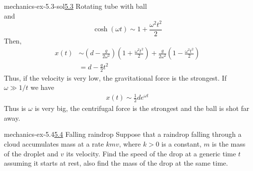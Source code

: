 \documentclass[preview]{standalone}
\begin{document}
\begin{snippetsolution}{mechanics-ex-5.3-sol}{\underline{5.3} Rotating tube with ball}
\[    \] and 
    \[
        \cosh(\omega t) \sim 1 + \frac{\omega^2 t^2}{2}
    \]
    Then,
    \begin{align*}
        x(t) &\sim \left(d - \frac{g}{2\omega^2}\right)
        \left(1 + \frac{\omega^2t^2}{2}\right)
        + \frac{g}{2\omega^2}\left(1 - \frac{\omega^2t^2}{2}\right) \\
        &= d - \frac{g}{2}t^2
    \end{align*}
    Thus, if the velocity is very low, the gravitational force is the strongest.
    If \(\omega \gg 1/t\) we have
    \begin{align*}
        x(t) \sim \frac{1}{2}de^{\omega t}
    \end{align*}
    Thus is \(\omega\) is very big, the centrifugal force is the strongest and the ball is shot far away.
\end{snippetsolution}

\begin{snippetexercise}{mechanics-ex-5.4}{\underline{5.4} Falling raindrop}
    Suppose that a raindrop falling through a cloud accumulates mass at a rate \(kmv\),
    where \(k > 0\) is a constant, \(m\) is the mass of the droplet and \(v\) its velocity.
    Find the speed of the drop at a generic time \(t\)
    assuming it starts at rest, also find the mass of the drop at the same time.
\end{snippetexercise}
\end{document}

